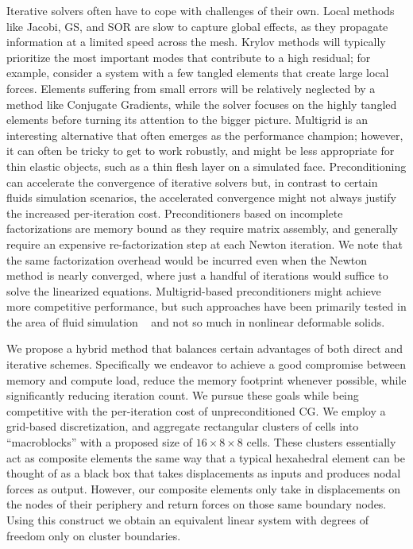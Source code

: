 Iterative solvers often have to cope with challenges of their
 own. Local methods like Jacobi, GS, and SOR are slow to capture
 global effects, as they propagate information at a limited speed
 across the mesh. Krylov methods will typically prioritize the most
 important modes that contribute to a high residual; for example,
 consider a system with a few tangled elements that create large local
 forces.  Elements suffering from small errors will be relatively
 neglected by a method like Conjugate Gradients, while the solver
 focuses on the highly tangled elements before turning its attention
 to the bigger picture. Multigrid is an interesting alternative that
 often emerges as the performance champion; however, it can often be
 tricky to get to work robustly, and might be less appropriate for
 thin elastic objects, such as a thin flesh layer on a simulated
 face. Preconditioning can accelerate the convergence of iterative
 solvers but, in contrast to certain fluids simulation scenarios, the
 accelerated convergence might not always justify the increased
 per-iteration cost. Preconditioners based on incomplete
 factorizations are memory bound as they require matrix assembly, and
 generally require an expensive re-factorization step at each Newton
 iteration. We note that the same factorization overhead would be
 incurred even when the Newton method is nearly converged, where just
 a handful of iterations would suffice to solve the linearized
 equations. Multigrid-based preconditioners might achieve more
 competitive performance, but such approaches have been primarily
 tested in the area of fluid simulation ~\citep{FerstWD:2014} and not so
 much in nonlinear deformable solids.

 We propose a hybrid method that balances certain advantages of both
 direct and iterative schemes. Specifically we endeavor to achieve a
 good compromise between memory and compute load, reduce the memory
 footprint whenever possible, while significantly reducing iteration
 count. We pursue these goals while being competitive with the
 per-iteration cost of unpreconditioned CG. We employ a grid-based
 discretization, and aggregate rectangular clusters of cells into
 ``macroblocks'' with a proposed size of $16\times 8\times 8$ cells.
 These clusters essentially act as composite elements the same way
 that a typical hexahedral element can be thought of as a black box
 that takes displacements as inputs and produces nodal forces as
 output. However, our composite elements only take in displacements on
 the nodes of their periphery and return forces on those same boundary
 nodes. Using this construct we obtain an equivalent linear system
 with degrees of freedom only on cluster boundaries.

